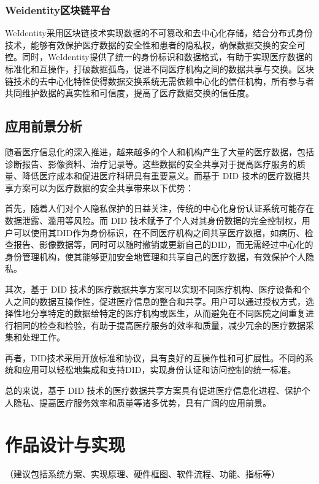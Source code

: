 \documentclass{cumcmthesis}
\numberwithin{equation}{section} %
\numberwithin{figure}{section} %
\numberwithin{table}{section} %
\begin{document}
\subsubsection{Weidentity区块链平台}
WeIdentity采用区块链技术实现数据的不可篡改和去中心化存储，结合分布式身份技术，能够有效保护医疗数据的安全性和患者的隐私权，确保数据交换的安全可控。同时，WeIdentity提供了统一的身份标识和数据格式，有助于实现医疗数据的标准化和互操作，打破数据孤岛，促进不同医疗机构之间的数据共享与交换。区块链技术的去中心化特性使得数据交换系统无需依赖中心化的信任机构，所有参与者共同维护数据的真实性和可信度，提高了医疗数据交换的信任度。

\subsection{应用前景分析}

随着医疗信息化的深入推进，越来越多的个人和机构产生了大量的医疗数据，包括诊断报告、影像资料、治疗记录等。这些数据的安全共享对于提高医疗服务的质量、降低医疗成本和促进医疗科研具有重要意义。而基于 DID 技术的医疗数据共享方案可以为医疗数据的安全共享带来以下优势：

首先，随着人们对个人隐私保护的日益关注，传统的中心化身份认证系统可能存在数据泄露、滥用等风险。而 DID 技术赋予了个人对其身份数据的完全控制权，用户可以使用其DID作为身份标识，在不同医疗机构之间共享医疗数据，如病历、检查报告、影像数据等，同时可以随时撤销或更新自己的DID，而无需经过中心化的身份管理机构，使其能够更加安全地管理和共享自己的医疗数据，有效保护个人隐私。

其次，基于 DID 技术的医疗数据共享方案可以实现不同医疗机构、医疗设备和个人之间的数据互操作性，促进医疗信息的整合和共享。用户可以通过授权方式，选择性地分享特定的数据给特定的医疗机构或医生，从而避免在不同医院之间重复进行相同的检查和检验，有助于提高医疗服务的效率和质量，减少冗余的医疗数据采集和处理工作。

再者，DID技术采用开放标准和协议，具有良好的互操作性和可扩展性。不同的系统和应用可以轻松地集成和支持DID，实现身份认证和访问控制的统一标准。

总的来说，基于 DID 技术的医疗数据共享方案具有促进医疗信息化进程、保护个人隐私、提高医疗服务效率和质量等诸多优势，具有广阔的应用前景。

\newpage

\section{作品设计与实现}

（建议包括系统方案、实现原理、硬件框图、软件流程、功能、指标等）
\end{document}
